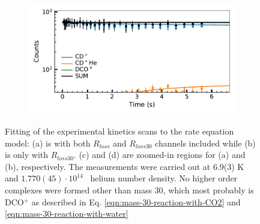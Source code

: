 \begin{figure}[!htb]
\begin{subfigure}[b]{0.49\textwidth}
    \end{subfigure}
    \hfill
    \begin{subfigure}[b]{0.49\textwidth}
        \centering
        \includegraphics[width=1\textwidth]{figures/measurements/kinetics/loss_channels/trap_and_m_30_loss_zoomed.pdf}
        \caption{}
        
    \end{subfigure}
    
    
        
    
    \caption{Fitting of the experimental kinetics scans to the rate equation model: (a) is with both $R_{loss}$ and $R_{loss30}$ channels included while (b) is only with $R_{loss30}$. (c) and (d) are zoomed-in regions for (a) and (b), respectively. The measurements were carried out at 6.9(3) K and  $1.770(45) \cdot 10^{14}$ \percc\ helium number density. No higher order complexes were formed other than mass 30, which most probably is DCO$^+$ as described in Eq. \ref{eqn:mass-30-reaction-with-CO2} and \ref{eqn:mass-30-reaction-with-water}}
    
    \label{fig:trap-and-m30-loss-channel-comparision}
\end{figure}